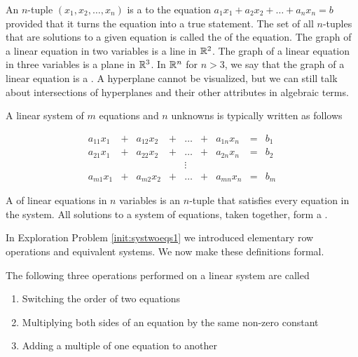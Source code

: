 \documentclass{ximera}
\begin{document}
An $n$-tuple $(x_1, x_2,\ldots ,x_n)$ is a  to the equation $a_1x_1+a_2x_2+\ldots +a_nx_n=b$ provided that it turns the equation into a true statement.  The set of all $n$-tuples that are solutions to a given equation is called the  of the equation. The graph of a linear equation in two variables is a line in $\mathbb{R}^2$.  The graph of a linear equation in three variables is a plane in $\mathbb{R}^3$.  In $\mathbb{R}^n$ for $n>3$, we say that the graph of a linear equation is a . A hyperplane cannot be visualized, but we can still talk about intersections of hyperplanes and their other attributes in algebraic terms.  

A linear system of $m$ equations and $n$ unknowns is typically written as follows

$$\begin{array}{ccccccccc}
      a_{11}x_1 &+ &a_{12}x_2&+&\ldots&+&a_{1n}x_n&= &b_1 \\
	 a_{21}x_1 &+ &a_{22}x_2&+&\ldots&+&a_{2n}x_n&= &b_2 \\
     &&&&\vdots&&&& \\
     a_{m1}x_1 &+ &a_{m2}x_2&+&\ldots&+&a_{mn}x_n&= &b_m
    \end{array}$$


A  of linear equations in $n$ variables is an $n$-tuple that satisfies every equation in  the system.  All solutions to a system of equations, taken together, form a .



In Exploration Problem \ref{init:systwoeqs1} we introduced elementary row operations and equivalent systems. We now make these definitions formal.

\begin{definition}\label{def:elemrowops}
The following three operations performed on a linear system are called 
\begin{enumerate}
\item\label{item:rowswap} Switching the order of two equations
\item\label{item:constantmult} Multiplying both sides of an equation by the same non-zero constant
\item\label{item:addrow} Adding a multiple of one equation to another
\end{enumerate}
\end{definition}
\end{document}
